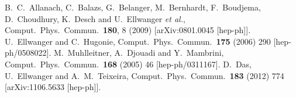 \documentclass[final,3p,times]{elsarticle}
\begin{document}
\begin{thebibliography}{10}
  B.~C.~Allanach, C.~Balazs, G.~Belanger, M.~Bernhardt, F.~Boudjema, D.~Choudhury, K.~Desch and U.~Ellwanger {\it et al.},
  Comput.\ Phys.\ Commun.\  {\bf 180}, 8 (2009)
  [arXiv:0801.0045 [hep-ph]].
  U.~Ellwanger and C.~Hugonie,
  Comput.\ Phys.\ Commun.\  {\bf 175} (2006) 290
  [hep-ph/0508022].
  M.~Muhlleitner, A.~Djouadi and Y.~Mambrini,
  Comput.\ Phys.\ Commun.\  {\bf 168} (2005) 46
  [hep-ph/0311167].
  D.~Das, U.~Ellwanger and A.~M.~Teixeira,
  Comput.\ Phys.\ Commun.\  {\bf 183} (2012) 774
  [arXiv:1106.5633 [hep-ph]].


\end{thebibliography}
\end{document}
